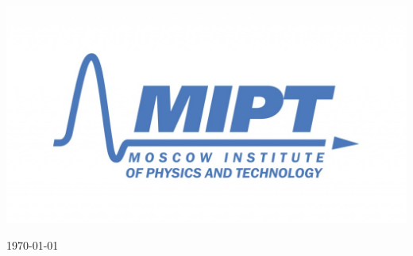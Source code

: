 \begin{titlepage}
\begin{bottompar}
	\begin{center}
		\includegraphics[width = 80 mm]{logo.jpg}
	\end{center}
	{\large \today}

\end{bottompar}
\vfill %

\end{titlepage}